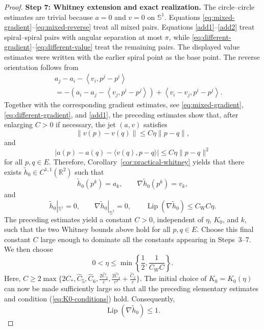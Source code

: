 \documentclass[11pt]{article}
\numberwithin{equation}{section}
\newcommand{\ip}[2]{\left\langle #1,#2\right\rangle}
\newcommand{\Sone}{\mathbb S^1}
\begin{document}
\begin{proof}
\medskip\noindent
\textbf{Step 7: Whitney extension and exact realization.}
The circle--circle estimates are trivial because \(a=0\) and \(v=0\) on
\(\Sone\).  Equations
\eqref{eq:mixed-gradient}--\eqref{eq:mixed-reverse} treat all mixed pairs.
Equations \eqref{add1}--\eqref{add2} treat
spiral--spiral pairs with angular separation at most \(\pi\), while
\eqref{eq:different-gradient}--\eqref{eq:different-value} treat the remaining
pairs.
The displayed value estimates were written with the earlier spiral point as
the base point.  The reverse orientation follows from
\begin{eqnarray}
    &&a_j-a_i-\ip{v_i}{p^j-p^i}\nonumber\\
    &&=
    -\left(a_i-a_j-\ip{v_j}{p^i-p^j}\right)
    +\ip{v_i-v_j}{p^i-p^j}.
\end{eqnarray}
Together with the corresponding gradient estimates, see
\eqref{eq:mixed-gradient}, \eqref{eq:different-gradient}, and
\eqref{add1},  the preceding estimates show that, after enlarging
\(C>0\) if necessary, the jet \((a,v)\) satisfies
\[
    \|v(p)-v(q)\|\le C\eta\|p-q\|,
\]
and
\[
    |a(p)-a(q)-\langle v(q),p-q\rangle|
    \le C\eta\|p-q\|^2
\]
for all \(p,q\in E\).
Therefore, Corollary~\ref{cor:practical-whitney} yields that there exists
\(\widetilde h_0\in C^{1,1}(\mathbb R^2)\) such that
\[
\widetilde h_0(p^k)=a_k,
\qquad
\nabla\widetilde h_0(p^k)=v_k,
\]
and
\[
\widetilde h_0|_{\mathbb S^1}=0,
\qquad
\nabla\widetilde h_0|_{\mathbb S^1}=0,
\qquad
\operatorname{Lip}(\nabla\widetilde h_0)
\le C_{\mathrm W}C\eta.
\]
The preceding estimates yield a constant \(C>0\), independent of
\(\eta\), \(K_0\), and \(k\), such that the two Whitney bounds above
hold for all \(p,q\in E\). Choose this final constant \(C\) large
enough to dominate all the constants appearing in Steps~3--7.
We then choose
\[
    0<\eta\leq
    \min\left\{\frac12,\frac{1}{C_WC}\right\}.
\] 
Here, $C\ge2\max\{2 C_*,\widehat C_5,\widehat C_6,\frac{2\widehat C_2}{c},
\frac{2\widehat C_4}{c^2}+\frac{\widehat C_2}{c} \}$.
The initial choice of \(K_0=K_0(\eta)\) can now be made sufficiently large so that all the preceding elementary estimates and condition (\ref{eq:K0-conditions}) hold.
Consequently,
\[
\operatorname{Lip}(\nabla\widetilde h_0)\le1.
\]



\end{proof}
\end{document}
